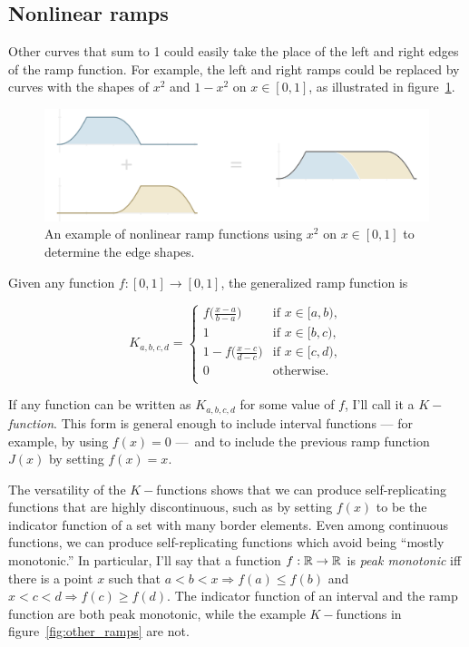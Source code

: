 \documentclass[20pt,]{extarticle}
\begin{document}
\subsection{Nonlinear ramps}\label{sec:nonlinear_ramps}

Other curves that sum to 1 could easily take the place of the left and
right edges of the ramp function. For example, the left and right ramps
could be replaced by curves with the shapes of \(x^2\) and \(1-x^2\) on
\(x\in [0, 1]\), as illustrated in figure~\ref{fig:nonlinear_ramps}.

\begin{figure}
\centering
\includegraphics{images/nonlinear_ramps2.png}
\caption{An example of nonlinear ramp functions using \(x^2\) on
\(x\in [0, 1]\) to determine the edge
shapes.}\label{fig:nonlinear_ramps}
\end{figure}

Given any function \(f:[0,1]\to [0,1]\), the generalized ramp function
is

\[ K_{a,b,c,d} = \begin{cases}
f\big(\frac{x - a}{b - a}\big) & \text{if } x \in [a, b), \\
1 & \text{if } x \in [b, c), \\
1 - f\big(\frac{x - c}{d - c}\big) & \text{if } x \in [c, d), \\
0 & \text{otherwise.} \\
\end{cases}\]

If any function can be written as \(K_{a,b,c,d}\) for some value of
\(f\), I'll call it a \(K-\)\emph{function}. This form is general enough
to include interval functions --- for example, by using \(f(x) = 0\)
---~and to include the previous ramp function \(J(x)\) by setting
\(f(x)=x\).

The versatility of the \(K-\)functions shows that we can produce
self-replicating functions that are highly discontinuous, such as by
setting \(f(x)\) to be the indicator function of a set with many border
elements. Even among continuous functions, we can produce
self-replicating functions which avoid being ``mostly monotonic.'' In
particular, I'll say that a function \(f:\mathbb{R}\to\mathbb{R}\) is \emph{peak
monotonic} iff there is a point \(x\) such that
\(a < b < x \Rightarrow f(a) \le f(b)\) and
\(x < c < d \Rightarrow f(c) \ge f(d)\). The indicator function of an
interval and the ramp function are both peak monotonic, while the
example \(K-\)functions in figure~\ref{fig:other_ramps} are not.
\end{document}
